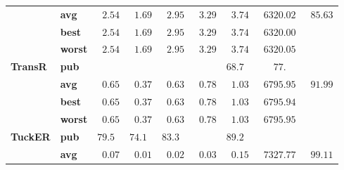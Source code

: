 \begin{tabular}{llrrrrrrr}
       & \textbf{avg} &  $\phantom{0}2.54$ &  $\phantom{0}1.69$ &  $\phantom{0}2.95$ &  $\phantom{0}3.29$ &  $\phantom{0}3.74$ &            $\phantom{0}6320.02$ &  $\phantom{0}85.63$ \\
       & \textbf{best} &  $\phantom{0}2.54$ &  $\phantom{0}1.69$ &  $\phantom{0}2.95$ &  $\phantom{0}3.29$ &  $\phantom{0}3.74$ &            $\phantom{0}6320.00$ &                     \\
       & \textbf{worst} &  $\phantom{0}2.54$ &  $\phantom{0}1.69$ &  $\phantom{0}2.95$ &  $\phantom{0}3.29$ &  $\phantom{0}3.74$ &            $\phantom{0}6320.05$ &                     \\\midrule
\textbf{TransR} & \textbf{pub} &                    &                    &                    &                    &  $68.7\phantom{0}$ &  $\phantom{000}77.\phantom{00}$ &                     \\
       & \textbf{avg} &  $\phantom{0}0.65$ &  $\phantom{0}0.37$ &  $\phantom{0}0.63$ &  $\phantom{0}0.78$ &  $\phantom{0}1.03$ &            $\phantom{0}6795.95$ &  $\phantom{0}91.99$ \\
       & \textbf{best} &  $\phantom{0}0.65$ &  $\phantom{0}0.37$ &  $\phantom{0}0.63$ &  $\phantom{0}0.78$ &  $\phantom{0}1.03$ &            $\phantom{0}6795.94$ &                     \\
       & \textbf{worst} &  $\phantom{0}0.65$ &  $\phantom{0}0.37$ &  $\phantom{0}0.63$ &  $\phantom{0}0.78$ &  $\phantom{0}1.03$ &            $\phantom{0}6795.95$ &                     \\\midrule
\textbf{TuckER} & \textbf{pub} &  $79.5\phantom{0}$ &  $74.1\phantom{0}$ &  $83.3\phantom{0}$ &                    &  $89.2\phantom{0}$ &                                 &                     \\
       & \textbf{avg} &  $\phantom{0}0.07$ &  $\phantom{0}0.01$ &  $\phantom{0}0.02$ &  $\phantom{0}0.03$ &  $\phantom{0}0.15$ &            $\phantom{0}7327.77$ &  $\phantom{0}99.11$ \\
\bottomrule
\end{tabular}

